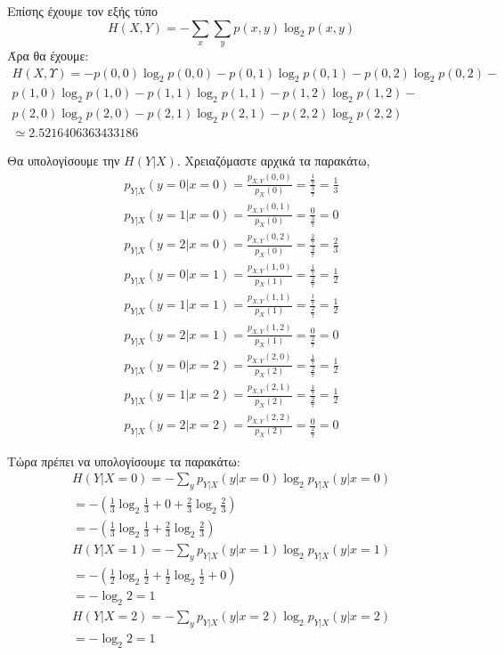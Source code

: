 \documentclass[12pt]{article}
\numberwithin{equation}{section}
\begin{document}
{{		Επίσης έχουμε τον εξής τύπο
		$$H(X,Y)=-\sum_{x}\sum_{y}p(x,y)\log_{2}p(x,y)$$
		Άρα θα έχουμε:
		\begin{gather*} 
			Η(X,Υ) = - p(0,0)\log_{2}p(0,0) - p(0,1)\log_{2}p(0,1) - p(0,2)\log_{2}p(0,2) - \\ p(1,0)\log_{2}p(1,0) - p(1,1)\log_{2}p(1,1) - p(1,2)\log_{2}p(1,2) - \\
			p(2,0)\log_{2}p(2,0) -  p(2,1)\log_{2}p(2,1) - p(2,2)\log_{2}p(2,2) \\
			\simeq 2.5216406363433186
		\end{gather*}
		
		Θα υπολογίσουμε την $H(Y|X)$.
		Χρειαζόμαστε αρχικά τα παρακάτω,
		\begin{gather*} 
			p_{Y|X}(y=0|x=0) = \frac{p_{X,Y}(0,0)}{p_{X}(0)} = \frac{\frac{1}{7}}{\frac{3}{7}} =\frac{1}{3} \\
			p_{Y|X}(y=1|x=0) = \frac{p_{X,Y}(0,1)}{p_{X}(0)} = \frac{0}{\frac{3}{7}} = 0 \\
			p_{Y|X}(y=2|x=0) = \frac{p_{X,Y}(0,2)}{p_{X}(0)} = \frac{\frac{2}{7}}{\frac{3}{7}} =\frac{2}{3} \\
			p_{Y|X}(y=0|x=1) = \frac{p_{X,Y}(1,0)}{p_{X}(1)} = \frac{\frac{1}{7}}{\frac{2}{7}} =\frac{1}{2} \\
			p_{Y|X}(y=1|x=1) = \frac{p_{X,Y}(1,1)}{p_{X}(1)} = \frac{\frac{1}{7}}{\frac{2}{7}} =\frac{1}{2} \\
			p_{Y|X}(y=2|x=1) = \frac{p_{X,Y}(1,2)}{p_{X}(1)} = \frac{0}{\frac{2}{7}} = 0 \\
			p_{Y|X}(y=0|x=2) = \frac{p_{X,Y}(2,0)}{p_{X}(2)} = \frac{\frac{1}{7}}{\frac{2}{7}} =\frac{1}{2} \\
			p_{Y|X}(y=1|x=2) = \frac{p_{X,Y}(2,1)}{p_{X}(2)} = \frac{\frac{1}{7}}{\frac{2}{7}} =\frac{1}{2} \\
			p_{Y|X}(y=2|x=2) = \frac{p_{X,Y}(2,2)}{p_{X}(2)} = \frac{0}{\frac{2}{7}} = 0
		\end{gather*}		
	}}

	Τώρα πρέπει να υπολογίσουμε τα παρακάτω: 
	\begin{gather*} 
		H(Y|X=0) = - \sum_{y}p_{Y|X}(y|x=0)\log_{2}p_{Y|X}(y|x=0) \\
		= -(\frac{1}{3}\log_{2}\frac{1}{3} + 0 + \frac{2}{3}\log_{2}\frac{2}{3}) \\
		= -(\frac{1}{3}\log_{2}\frac{1}{3} + \frac{2}{3}\log_{2}\frac{2}{3}) \\
		H(Y|X=1) = - \sum_{y}p_{Y|X}(y|x=1)\log_{2}p_{Y|X}(y|x=1) \\
		= -(\frac{1}{2}\log_{2}\frac{1}{2} + \frac{1}{2}\log_{2}\frac{1}{2} + 0) \\
		= - \log_{2}2 = 1\\
		H(Y|X=2) = - \sum_{y}p_{Y|X}(y|x=2)\log_{2}p_{Y|X}(y|x=2) \\
		= - \log_{2}2 = 1\\
	\end{gather*}
	
\end{document}
